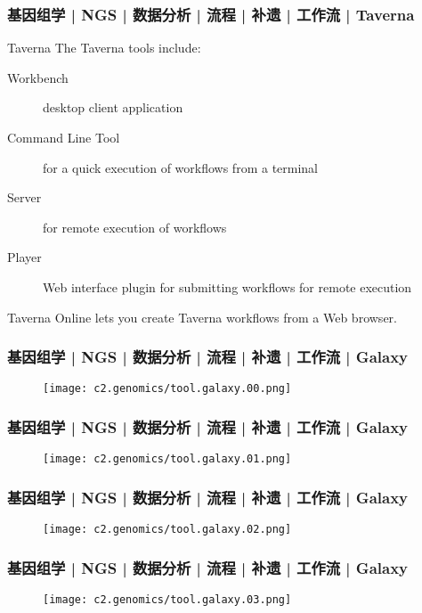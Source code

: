 \begin{frame}
  \frametitle{基因组学 | NGS | 数据分析 | 流程 | 补遗 | 工作流 | Taverna}
  \begin{block}{Taverna}
    The Taverna tools include:
    \begin{description}
      \item[Workbench] desktop client application
      \item[Command Line Tool] for a quick execution of workflows from a terminal
      \item[Server] for remote execution of workflows
      \item[Player] Web interface plugin for submitting workflows for remote execution
    \end{description}
    Taverna Online lets you create Taverna workflows from a Web browser.
  \end{block}
\end{frame}

\begin{frame}
  \frametitle{基因组学 | NGS | 数据分析 | 流程 | 补遗 | 工作流 | Galaxy}
  \begin{figure}
    \centering
    \texttt{[image: c2.genomics/tool.galaxy.00.png]}
  \end{figure}
\end{frame}

\begin{frame}
  \frametitle{基因组学 | NGS | 数据分析 | 流程 | 补遗 | 工作流 | Galaxy}
  \begin{figure}
    \centering
    \texttt{[image: c2.genomics/tool.galaxy.01.png]}
  \end{figure}
\end{frame}

\begin{frame}
  \frametitle{基因组学 | NGS | 数据分析 | 流程 | 补遗 | 工作流 | Galaxy}
  \begin{figure}
    \centering
    \texttt{[image: c2.genomics/tool.galaxy.02.png]}
  \end{figure}
\end{frame}

\begin{frame}
  \frametitle{基因组学 | NGS | 数据分析 | 流程 | 补遗 | 工作流 | Galaxy}
  \begin{figure}
    \centering
    \texttt{[image: c2.genomics/tool.galaxy.03.png]}
  \end{figure}
\end{frame}

